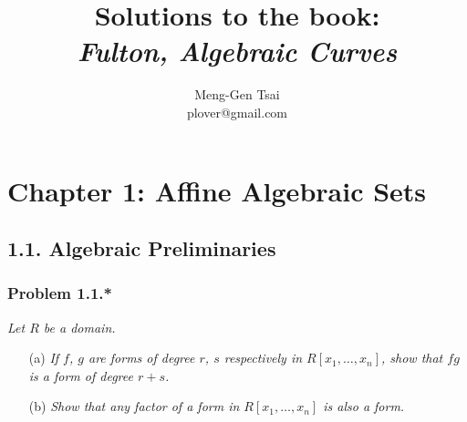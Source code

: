 \documentclass{article}
\title{\textbf{Solutions to the book: \\\emph{Fulton, Algebraic Curves}}}
\author{Meng-Gen Tsai \\ plover@gmail.com}
\begin{document}
\maketitle
\tableofcontents






\newpage
\section*{Chapter 1: Affine Algebraic Sets \\}



\subsection*{1.1. Algebraic Preliminaries \\}



\subsubsection*{Problem 1.1.*}
\emph{Let $R$ be a domain.}
\begin{enumerate}
\item[(a)]
  \emph{If $f$, $g$ are forms of degree $r$, $s$ respectively in $R[x_1,\ldots,x_n]$,
  show that $fg$ is a form of degree $r+s$.}

\item[(b)]
  \emph{Show that any factor of a form in $R[x_1,\ldots,x_n]$ is also a form. } \\
\end{enumerate}
\end{document}
